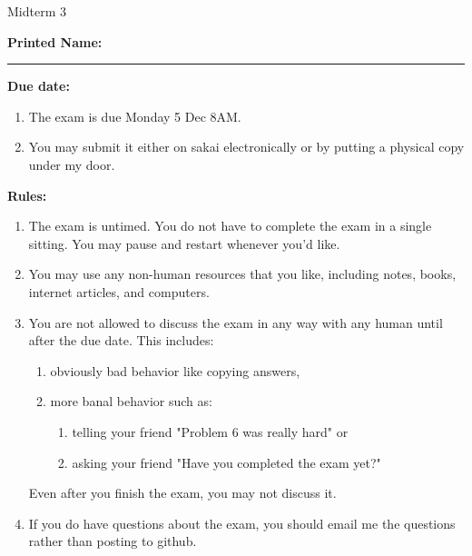 \documentclass[10pt]{exam}
\theoremstyle{definition}
\begin{document}
\begin{center}
{
\Huge
    Midterm 3
}
\end{center}

\vspace{0.5in}
\noindent
\textbf{Printed Name:}

\noindent
\rule{\textwidth}{0.1pt}
\vspace{0.25in}

%
%
    \noindent
\textbf{Due date:}
\begin{enumerate}
    \item
        The exam is due Monday 5 Dec 8AM.

    \item
        You may submit it either on sakai electronically or by putting a physical copy under my door.
\end{enumerate}

\vspace{0.15in}
\noindent
\textbf{Rules:}
\begin{enumerate}
    \item
        The exam is untimed.
        You do not have to complete the exam in a single sitting.
        You may pause and restart whenever you'd like.

    \item
    You may use any non-human resources that you like, including notes, books, internet articles, and computers.

    \item
    You are not allowed to discuss the exam in any way with any human until after the due date. This includes:
        \begin{enumerate}
            \item obviously bad behavior like copying answers, 
            \item more banal behavior such as:
                \begin{enumerate}
                    \item telling your friend "Problem 6 was really hard" or 
                    \item asking your friend "Have you completed the exam yet?"
                \end{enumerate}
        \end{enumerate}
        
        Even after you finish the exam, you may not discuss it.

    \item
    If you do have questions about the exam, you should email me the questions rather than posting to github.

\end{enumerate}
\end{document}
